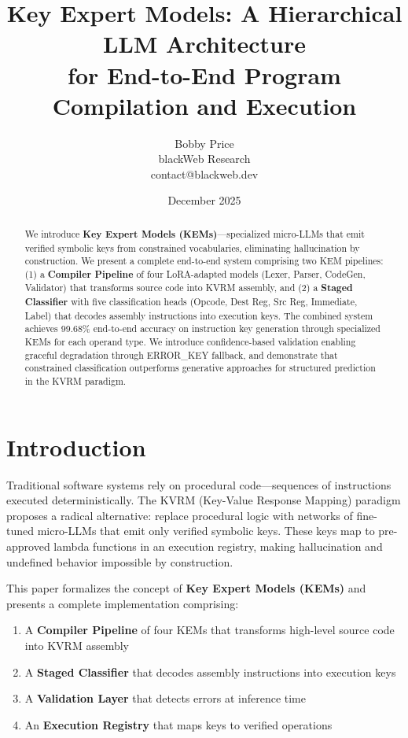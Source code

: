\documentclass[11pt]{article}
\title{Key Expert Models: A Hierarchical LLM Architecture\\for End-to-End Program Compilation and Execution}
\author{Bobby Price\\blackWeb Research\\contact@blackweb.dev}
\date{December 2025}
\begin{document}
\maketitle

\begin{abstract}
We introduce \textbf{Key Expert Models (KEMs)}---specialized micro-LLMs that emit verified symbolic keys from constrained vocabularies, eliminating hallucination by construction. We present a complete end-to-end system comprising two KEM pipelines: (1) a \textbf{Compiler Pipeline} of four LoRA-adapted models (Lexer, Parser, CodeGen, Validator) that transforms source code into KVRM assembly, and (2) a \textbf{Staged Classifier} with five classification heads (Opcode, Dest Reg, Src Reg, Immediate, Label) that decodes assembly instructions into execution keys. The combined system achieves 99.68\% end-to-end accuracy on instruction key generation through specialized KEMs for each operand type. We introduce confidence-based validation enabling graceful degradation through ERROR\_KEY fallback, and demonstrate that constrained classification outperforms generative approaches for structured prediction in the KVRM paradigm.
\end{abstract}

\section{Introduction}

Traditional software systems rely on procedural code---sequences of instructions executed deterministically. The KVRM (Key-Value Response Mapping) paradigm proposes a radical alternative: replace procedural logic with networks of fine-tuned micro-LLMs that emit only verified symbolic keys. These keys map to pre-approved lambda functions in an execution registry, making hallucination and undefined behavior impossible by construction.

This paper formalizes the concept of \textbf{Key Expert Models (KEMs)} and presents a complete implementation comprising:

\begin{enumerate}
    \item A \textbf{Compiler Pipeline} of four KEMs that transforms high-level source code into KVRM assembly
    \item A \textbf{Staged Classifier} that decodes assembly instructions into execution keys
    \item A \textbf{Validation Layer} that detects errors at inference time
    \item An \textbf{Execution Registry} that maps keys to verified operations
\end{enumerate}
\end{document}
